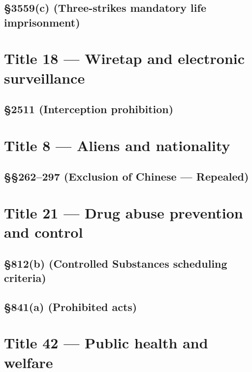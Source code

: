 \subsection*{§3559(c) (Three-strikes mandatory life imprisonment)}
\label{apx:usc:18:3559c}


\section*{Title 18 --- Wiretap and electronic surveillance}

\subsection*{§2511 (Interception prohibition)}
\label{apx:usc:18:2511}


\section*{Title 8 --- Aliens and nationality}

\subsection*{§§262--297 (Exclusion of Chinese --- Repealed)}
\label{apx:usc:8:ch7}


\section*{Title 21 --- Drug abuse prevention and control}

\subsection*{§812(b) (Controlled Substances scheduling criteria)}
\label{apx:usc:21:812b}


\subsection*{§841(a) (Prohibited acts)}
\label{apx:usc:21:841a}


\section*{Title 42 --- Public health and welfare}

